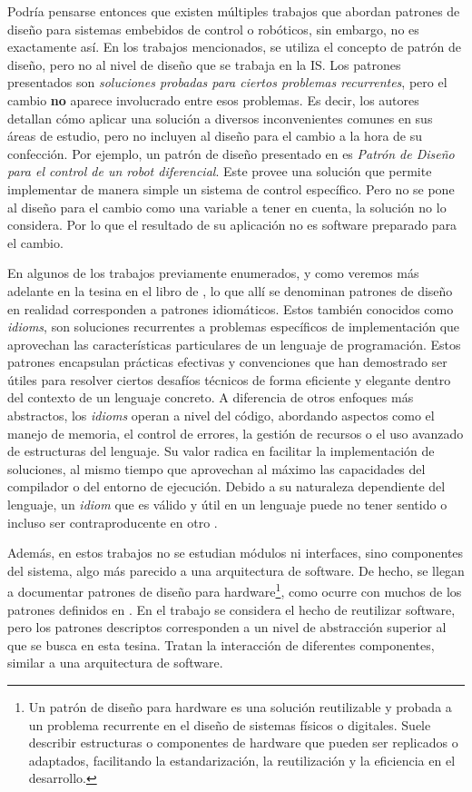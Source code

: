 Podría pensarse entonces que existen múltiples trabajos que abordan patrones de diseño para sistemas embebidos de control o robóticos, sin embargo, no es exactamente así. En los trabajos mencionados, se utiliza el concepto de patrón de diseño, pero no al nivel de diseño que se trabaja en la IS. Los patrones presentados son \textit{soluciones probadas para ciertos problemas recurrentes}, pero el cambio \textbf{no} aparece involucrado entre esos problemas. Es decir, los autores detallan cómo aplicar una solución a diversos inconvenientes comunes en sus áreas de estudio, pero no incluyen al diseño para el cambio a la hora de su confección. Por ejemplo, un patrón de diseño presentado en \cite{robotArg} es \textit{Patrón de Diseño para el control de un robot diferencial}. Este provee una solución que permite implementar de manera simple un sistema de control específico. Pero no se pone al diseño para el cambio como una variable a tener en cuenta, la solución no lo considera. Por lo que el resultado de su aplicación no es software preparado para el cambio.

En algunos de los trabajos previamente enumerados, y como veremos más adelante en la tesina en el libro de \cite{douglass}, lo que allí se denominan patrones de diseño en realidad corresponden a patrones idiomáticos. Estos también conocidos como \textit{idioms}, son soluciones recurrentes a problemas específicos de implementación que aprovechan las características particulares de un lenguaje de programación. Estos patrones encapsulan prácticas efectivas y convenciones que han demostrado ser útiles para resolver ciertos desafíos técnicos de forma eficiente y elegante dentro del contexto de un lenguaje concreto. A diferencia de otros enfoques más abstractos, los \textit{idioms} operan a nivel del código, abordando aspectos como el manejo de memoria, el control de errores, la gestión de recursos o el uso avanzado de estructuras del lenguaje. Su valor radica en facilitar la implementación de soluciones, al mismo tiempo que aprovechan al máximo las capacidades del compilador o del entorno de ejecución. Debido a su naturaleza dependiente del lenguaje, un \textit{idiom} que es válido y útil en un lenguaje puede no tener sentido o incluso ser contraproducente en otro \cite{buschmann1996posa1}.

Además, en estos trabajos no se estudian módulos ni interfaces, sino componentes del sistema, algo más parecido a una arquitectura de software. De hecho, se llegan a documentar patrones de diseño para hardware\footnote{Un patrón de diseño para hardware es una solución reutilizable y probada a un problema recurrente en el diseño de sistemas físicos o digitales. Suele describir estructuras o componentes de hardware que pueden ser replicados o adaptados, facilitando la estandarización, la reutilización y la eficiencia en el desarrollo.}, como ocurre con muchos de los patrones definidos en \cite{critical}. En el trabajo \cite{stable} se considera el hecho de reutilizar software, pero los patrones descriptos corresponden a un nivel de abstracción superior al que se busca en esta tesina. Tratan la interacción de diferentes componentes, similar a una arquitectura de software.

